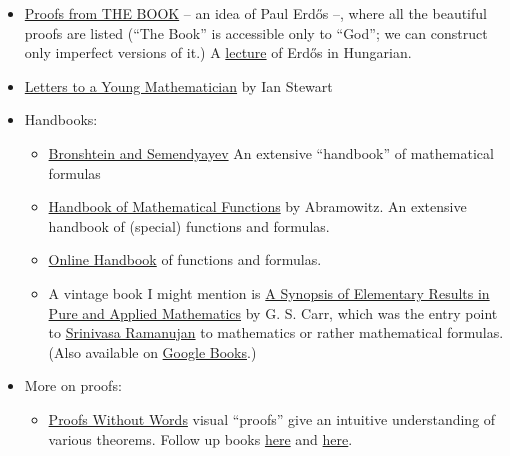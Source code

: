\documentclass{article}
\begin{document}
\begin{itemize}
    \item \href{https://www.goodreads.com/book/show/696238.Proofs_from_THE_BOOK}{Proofs from THE BOOK} -- an idea of Paul Erdős --, where all the beautiful proofs are listed (``The Book'' is accessible only to ``God''; we can construct only imperfect versions of it.) A \href{https://www.youtube.com/watch?v=-oxfHwSzoM4}{lecture} of Erdős in Hungarian.

    \item \href{https://www.goodreads.com/book/show/537480.Letters_to_a_Young_Mathematician}{Letters to a Young Mathematician} by Ian Stewart
    
    \item Handbooks:
    \begin{itemize}

        \item \href{https://www.goodreads.com/book/show/1904487.Handbook_of_Mathematics}{Bronshtein and Semendyayev} An extensive ``handbook'' of mathematical formulas
    
        \item \href{https://www.goodreads.com/book/show/1296073.Handbook_of_Mathematical_Functions}{Handbook of Mathematical Functions} by Abramowitz. An extensive handbook of (special) functions and formulas.
    
        \item \href{https://dlmf.nist.gov/}{Online Handbook} of functions and formulas.

        \item A vintage book I might mention is \href{https://archive.org/details/synopsisofelemen00carrrich/}{A Synopsis of Elementary Results in Pure and Applied Mathematics} by G. S. Carr, which was the entry point to \href{https://en.wikipedia.org/wiki/Synopsis_of_Pure_Mathematics}{Srinivasa Ramanujan} to mathematics or rather mathematical formulas. (Also available on \href{https://www.google.com/books/edition/A_Synopsis_of_Elementary_Results_in_Pure/JLmCAAAAIAAJ}{Google Books}.)
    \end{itemize}
    
    \item More on proofs:
    \begin{itemize}
        \item \href{https://www.goodreads.com/book/show/365666.Proofs_Without_Words}{Proofs Without Words} visual ``proofs'' give an intuitive understanding of various theorems. Follow up books \href{https://www.goodreads.com/book/show/365667.Proofs_Without_Words_II}{here} and \href{https://www.goodreads.com/book/show/9655655-charming-proofs}{here}.
    

\end{itemize}
\end{itemize}
\end{document}
